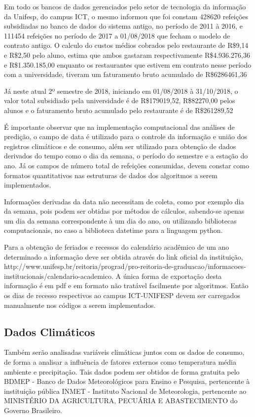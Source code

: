 \documentclass[	12pt, Times, openright, twoside, a4paper, english, brazil]{abntex2}
\begin{document}
          Em todo os bancos de dados gerenciados pelo setor de tecnologia da informação da Unifesp, do campus ICT, o mesmo informou que foi constam 428620 refeições subsidiadas no banco de dados do sistema antigo, no período de 2011 à 2016, e 111454 refeições no período de 2017 a 01/08/2018 que fecham o modelo de contrato antigo. O calculo do custos médios cobrados pelo restaurante de R\$9,14 e R\$2,50 pelo aluno, estima que ambos gastaram respectivamente R\$4.936.276,36 e R\$1.350.185,00 enquanto os restaurantes que estivem em contrato nesse período com a universidade, tiveram um faturamento bruto acumulado de R\$6286461,36

          Já neste atual 2º semestre de 2018, iniciando em 01/08/2018 à 31/10/2018, o valor total subsidiado pela universidade é de R\$179019,52, R\$82270,00 pelos alunos e o faturamento bruto acumulado pelo restaurante é de R\$261289,52

          É importante observar que na implementação computacional das análises de predição, o campo de data é utilizado para o controle da informação e união dos registros climáticos e de consumo, além ser utilizado para obtenção de dados derivados do tempo como o dia da semana, o período do semestre e a estação do ano. Já os campos de número total de refeições consumidas, devem constar como formatos quantitativos nas estruturas de dados dos algoritmos a serem implementados.

          Informações derivadas da data não necessitam de coleta, como por exemplo dia da semana, pois podem ser obtidas por métodos de cálculos, sabendo-se apenas um dia da semana correspondente à um dia do ano, ou utilizando bibliotecas computacionais, no caso a biblioteca datetime para a linguagem python.

          Para a obtenção de feriados e recessos do calendário acadêmico de um ano determinado a informação deve ser obtida através do link oficial da instituição, http://www.unifesp.br/reitoria/prograd/pro-reitoria-de-graduacao/informacoes-institucionais/calendario-academico. A única forma de exportação desta informação é em pdf e em formato não tratável facilmente por algoritmos. Então os dias de recesso respectivos ao campus ICT-UNIFESP devem ser carregados manualmente nos códigos a serem implementados.

        \subsection{Dados Climáticos}
          Também serão analisadas variáveis climáticas juntos com os dados de consumo, de forma a analisar a influência de fatores externos como temperatura média ambiente e precipitação. Tais dados podem ser obtidos de forma gratuita pelo BDMEP - Banco de Dados Meteorológicos para Ensino e Pesquisa, pertencente à instituição pública INMET - Instituto Nacional de Meteorologia, pertencente ao MINISTÉRIO DA AGRICULTURA, PECUÁRIA E ABASTECIMENTO do Governo Brasileiro. 
\end{document}
